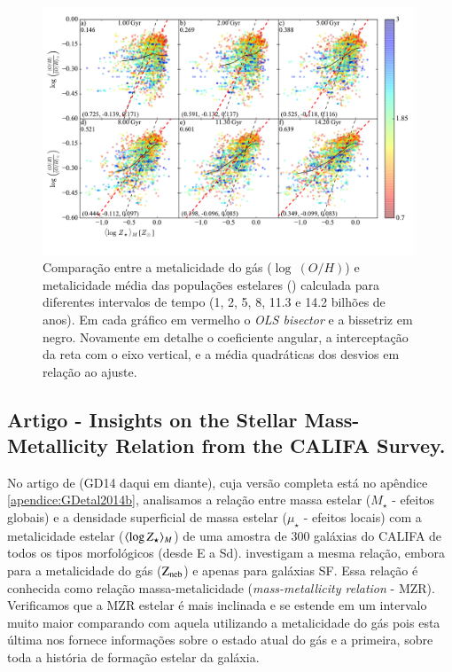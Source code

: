 \begin{figure}
	\centering
	\includegraphics[width=0.99\textwidth]{figuras/CompareZR.pdf}
	\caption[ vs. $\log\ (O/H)$ - perfis radiais]
	{Comparação entre a metalicidade do gás ($\log\ (O/H)$) e metalicidade média das populações
estelares () calculada para diferentes intervalos de tempo (1, 2, 5, 8, 11.3 e
14.2 bilhões de anos). Em cada gráfico em vermelho o {\em OLS bisector} e a bissetriz em negro.
Novamente em detalhe o coeficiente angular, a interceptação da reta com o eixo vertical, e a média
quadráticas dos desvios em relação ao ajuste.}
	\label{fig:compareZR}
\end{figure}


\subsection{Artigo - Insights on the Stellar Mass-Metallicity Relation from the CALIFA Survey.}

No artigo de \citet{GonzalezDelgado.etal.2014b} (GD14 daqui em diante), cuja versão completa está no
apêndice \ref{apendice:GDetal2014b}, analisamos a relação entre massa estelar ($M_\star$ - efeitos
globais) e a densidade superficial de massa estelar ($\mu_\star$ - efeitos locais) com a
metalicidade estelar ($\meanM{\log Z_\star}$) de uma amostra de 300 galáxias do CALIFA de todos os
tipos morfológicos (desde E a Sd). \citet{Tremonti.etal.2004a} investigam a mesma relação, embora
para a metalicidade do gás ($\mathrm{Z}_{\mathrm{neb}}$) e apenas para galáxias SF. Essa relação é conhecida como relação
massa-metalicidade ({\em mass-metallicity relation} - MZR). Verificamos que a MZR estelar é mais
inclinada e se estende em um intervalo muito maior comparando com aquela utilizando a metalicidade
do gás pois esta última nos fornece informações sobre o estado atual do gás e a primeira, sobre toda
a história de formação estelar da galáxia. 

